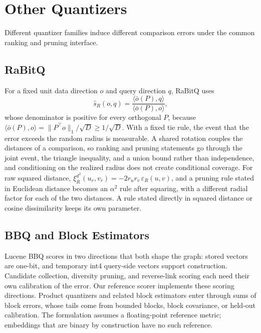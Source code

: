 \section{Other Quantizers}
\label{app:p7}

Different quantizer families induce different comparison errors under the common ranking and pruning interface.

\subsection{RaBitQ}

For a fixed unit data direction $o$ and query direction $q$, RaBitQ uses
\begin{equation}
\widehat s_R(o,q)=\frac{\langle\bar o(P),q\rangle}{\langle\bar o(P),o\rangle},
\end{equation}
whose denominator is positive for every orthogonal $P$, because $\langle\bar o(P),o\rangle=\|P^\top o\|_1/\sqrt D\ge1/\sqrt D$. With a fixed tie rule, the event that the error exceeds the random radius is measurable. A shared rotation couples the distances of a comparison, so ranking and pruning statements go through the joint event, the triangle inequality, and a union bound rather than independence, and conditioning on the realized radius does not create conditional coverage. For raw squared distance,
$\xi_R^{d^2}(u_r,v_r)=-2r_ur_v\,\varepsilon_R(u,v)$,
and a pruning rule stated in Euclidean distance becomes an $\alpha^2$ rule after squaring, with a different radial factor for each of the two distances. A rule stated directly in squared distance or cosine dissimilarity keeps its own parameter.

\subsection{BBQ and Block Estimators}

Lucene BBQ scores in two directions that both shape the graph: stored vectors are one-bit, and temporary int4 query-side vectors support construction. Candidate collection, diversity pruning, and reverse-link scoring each need their own calibration of the error. Our reference scorer implements these scoring directions. Product quantizers and related block estimators enter through sums of block errors, whose tails come from bounded blocks, block covariance, or held-out calibration. The formulation assumes a floating-point reference metric; embeddings that are binary by construction have no such reference.
